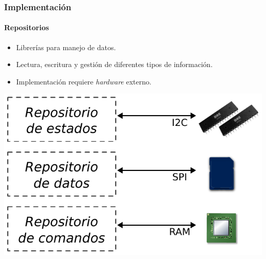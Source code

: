 \documentclass[xcolor=dvipsnames]{beamer}
\begin{document}
\begin{frame}
    \frametitle{Implementación}
    \framesubtitle{Repositorios}
    
    \begin{itemize}
        \item Librerías para manejo de datos.
        \item Lectura, escritura y gestión de diferentes tipos de información.
        \item Implementación requiere \textit{hardware} externo.
    \end{itemize}
    
    \begin{center}
        \includegraphics[height=0.5\textheight]{img/implementacion_repos.pdf}
    \end{center}
    
\end{frame}

    \begin{frame}
        \centering \Large {}
        
    \end{frame}
    
\end{document}
